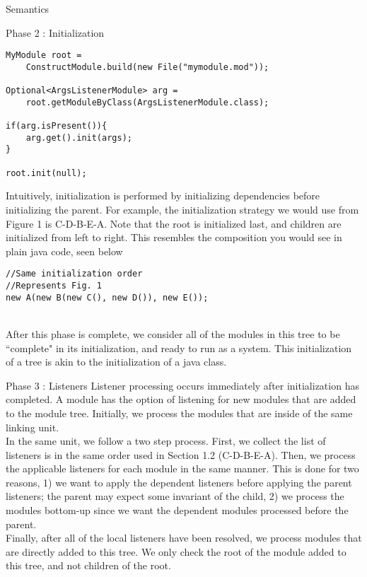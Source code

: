 \documentclass[11pt]{article}
\begin{document}
\begin{section}{Semantics}
\begin{subsection}{Phase 2 : Initialization}
\begin{verbatim}
MyModule root = 
    ConstructModule.build(new File("mymodule.mod"));

Optional<ArgsListenerModule> arg = 
    root.getModuleByClass(ArgsListenerModule.class);
    
if(arg.isPresent()){
    arg.get().init(args);
}

root.init(null);
\end{verbatim}

Intuitively, initialization is performed by initializing dependencies before initializing the parent. For example, the initialization strategy we would use from Figure 1 is C-D-B-E-A. Note that the root is initialized last, and children are initialized from left to right. This resembles the composition you would see in plain java code, seen below
\begin{verbatim}
//Same initialization order
//Represents Fig. 1
new A(new B(new C(), new D()), new E());
\end{verbatim}\\

After this phase is complete, we consider all of the modules in this tree to be ``complete" in its initialization, and ready to run as a system. This initialization of a tree is akin to the initialization of a java class.
\end{subsection}

\begin{subsection}{Phase 3 : Listeners}
Listener processing occurs immediately after initialization has completed. A module has the option of listening for new modules that are added to the module tree. Initially, we process the modules that are inside of the same linking unit.\\

In the same unit, we follow a two step process. First, we collect the list of listeners is in the same order used in Section 1.2 (C-D-B-E-A). Then, we process the applicable listeners for each module in the same manner. This is done for two reasons, 1) we want to apply the dependent listeners before applying the parent listeners; the parent may expect some invariant of the child, 2) we process the modules bottom-up since we want the dependent modules processed before the parent.\\ 

Finally, after all of the local listeners have been resolved, we process modules that are directly added to this tree. We only check the root of the module added to this tree, and not children of the root.
\end{subsection}
\end{section}
\end{document}
